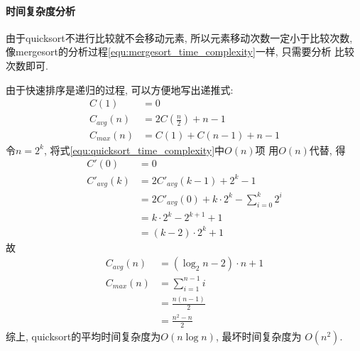 \paragraph{时间复杂度分析}
由于quicksort不进行比较就不会移动元素, 所以元素移动次数一定小于比较次数,
像mergesort的分析过程\ref{equ:mergesort_time_complexity}一样, 只需要分析
比较次数即可.\par
由于快速排序是递归的过程, 可以方便地写出递推式:
\begin{align}
	\label{equ:quicksort_time_complexity}
	C(1)       & = 0                        \nonumber \\
	C_{avg}(n) & = 2C(\frac{n}{2}) + n - 1  \nonumber \\
	C_{max}(n) & = C(1) + C(n - 1) + n - 1  \nonumber
\end{align}
令\(n=2^k\), 将式\ref{equ:quicksort_time_complexity}中$O(n)$项
用$O(n)$代替, 得
\begin{align}
	C'(0)       & = 0                                           \nonumber \\
	C'_{avg}(k) & = 2C'_{avg}(k-1)+2^k-1                        \nonumber \\
	            & = 2C'_{avg}(0)+k\cdot 2^k - \sum_{i=0}^k 2^i  \nonumber \\
	            & = k\cdot 2^k - 2^{k+1}+1                      \nonumber \\
	            & = (k-2)\cdot 2^k + 1 \nonumber
\end{align}
故
\begin{align}
	C_{avg}(n) & = (\log_2{n}-2)\cdot n+1  \nonumber \\
	C_{max}(n) & = \sum_{i=1}^{n-1}i       \nonumber \\
	           & = \frac{n(n-1)}{2}        \nonumber \\
	           & =\frac{n^2-n}{2}          \nonumber
\end{align}
综上, quicksort的平均时间复杂度为$O(n\log n)$, 最坏时间复杂度为
$O(n^2)$.
